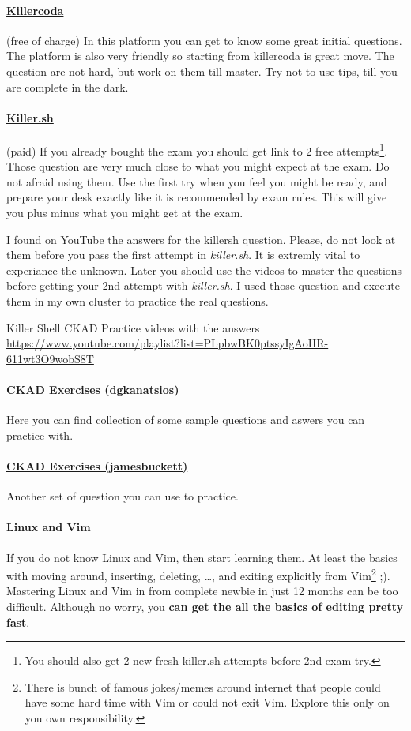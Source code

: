 \paragraph{\href{https://killercoda.com}{Killercoda}} (free of charge) In this platform you can get to know some great initial questions. The platform is also very friendly so starting from killercoda is great move. The question are not hard, but work on them till master. Try not to use tips, till you are complete in the dark.

\paragraph{\href{https://killer.sh/}{Killer.sh}} (paid) If you already bought the exam you should get link to 2 free attempts\footnote{You should also get 2 new fresh killer.sh attempts before 2nd exam try.}. Those question are very much close to what you might expect at the exam. Do not afraid using them. Use the first try when you feel you might be ready, and prepare your desk exactly like it is recommended by exam rules\cite{linuxfoundation-exam-rules}. This will give you plus minus what you might get at the exam.

I found on YouTube the answers for the killersh question. Please, do not look at them before you pass the first attempt in \textit{killer.sh}. It is extremly vital to experiance the unknown. Later you should use the videos to master the questions before getting your 2nd attempt with \textit{killer.sh}. I used those question and execute them in my own cluster to practice the real questions.

Killer Shell CKAD Practice videos with the answers \url{https://www.youtube.com/playlist?list=PLpbwBK0ptssyIgAoHR-611wt3O9wobS8T}

\paragraph{\href{https://github.com/dgkanatsios/CKAD-exercises}{CKAD Exercises (dgkanatsios)}} Here you can find collection of some sample questions and aswers you can practice with.

\paragraph{\href{https://github.com/jamesbuckett/ckad-questions}{CKAD Exercises (jamesbuckett)}} Another set of question you can use to practice.

\paragraph{Linux and Vim} If you do not know Linux and Vim, then start learning them. At least the basics with moving around, inserting, deleting, \ldots, and exiting explicitly from Vim\footnote{There is bunch of famous jokes/memes around internet that people could have some hard time with Vim or could not exit Vim. Explore this only on you own responsibility.} ;). Mastering Linux and Vim in from complete newbie in just 12 months can be too difficult. Although no worry, you \textbf{can get the all the basics of editing pretty fast}.\\

